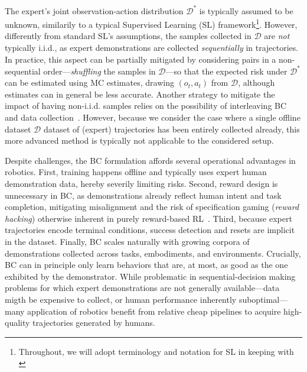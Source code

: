 The expert's joint observation-action distribution \( \mathcal D^* \) is typically assumed to be unknown, similarily to a typical Supervised Learning (SL) framework\footnote{Throughout, we will adopt terminology and notation for SL in keeping with \citet{shalev-shwartzUnderstandingMachineLearning2014}}.
However, differently from standard SL's assumptions, the samples collected in \( \mathcal D \) are \emph{not} typically i.i.d., as expert demonstrations are collected \emph{sequentially} in trajectories.
In practice, this aspect can be partially mitigated by considering pairs in a non-sequential order---\emph{shuffling} the samples in \(\mathcal D \)---so that the expected risk under \( \mathcal D^* \) can be estimated using MC estimates, drawing \((o_t, a_t)\) from \( \mathcal D \), although estimates can in general be less accurate.
Another strategy to mitigate the impact of having non-i.i.d. samples relies on the possibility of interleaving BC and data collection~\citep{rossReductionImitationLearning2011}. 
However, because we consider the case where a single offline dataset \( \mathcal D \) dataset of (expert) trajectories has been entirely collected already, this more advanced method is typically not applicable to the considered setup.

Despite challenges, the BC formulation affords several operational advantages in robotics.
First, training happens offline and typically uses expert human demonstration data, hereby severily limiting risks.
Second, reward design is unnecessary in BC, as demonstrations already reflect human intent and task completion, mitigating misalignment and the risk of specification gaming (\emph{reward hacking}) otherwise inherent in purely reward-based RL~\citep{heessEmergenceLocomotionBehaviours2017}.
Third, because expert trajectories encode terminal conditions, success detection and resets are implicit in the dataset.
Finally, BC scales naturally with growing corpora of demonstrations collected across tasks, embodiments, and environments.
Crucially, BC can in principle only learn behaviors that are, at most, as good as the one exhibited by the demonstrator.
While problematic in sequential-decision making problems for which expert demonstrations are not generally available---data migth be expensive to collect, or human performance inherently suboptimal---many application of robotics benefit from relative cheap pipelines to acquire high-quality trajectories generated by humans. 

